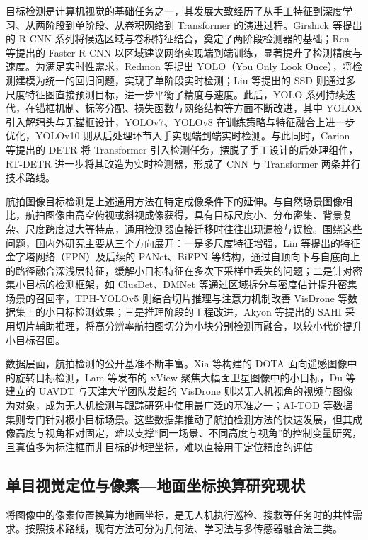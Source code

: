 目标检测是计算机视觉的基础任务之一，其发展大致经历了从手工特征到深度学习、从两阶段到单阶段、从卷积网络到 Transformer 的演进过程。Girshick 等提出的 R-CNN 系列将候选区域与卷积特征结合，奠定了两阶段检测器的基础；Ren 等提出的 Faster R-CNN 以区域建议网络实现端到端训练，显著提升了检测精度与速度。为满足实时性需求，Redmon 等提出 YOLO（You Only Look Once），将检测建模为统一的回归问题，实现了单阶段实时检测；Liu 等提出的 SSD 则通过多尺度特征图直接预测目标，进一步平衡了精度与速度。此后，YOLO 系列持续迭代，在锚框机制、标签分配、损失函数与网络结构等方面不断改进，其中 YOLOX 引入解耦头与无锚框设计，YOLOv7、YOLOv8 在训练策略与特征融合上进一步优化，YOLOv10 则从后处理环节入手实现端到端实时检测。与此同时，Carion 等提出的 DETR 将 Transformer 引入检测任务，摆脱了手工设计的后处理组件，RT-DETR 进一步将其改造为实时检测器，形成了 CNN 与 Transformer 两条并行技术路线。

航拍图像目标检测是上述通用方法在特定成像条件下的延伸。与自然场景图像相比，航拍图像由高空俯视或斜视成像获得，具有目标尺度小、分布密集、背景复杂、尺度跨度过大等特点，通用检测器直接迁移时往往出现漏检与误检。围绕这些问题，国内外研究主要从三个方向展开：一是多尺度特征增强，Lin 等提出的特征金字塔网络（FPN）及后续的 PANet、BiFPN 等结构，通过自顶向下与自底向上的路径融合深浅层特征，缓解小目标特征在多次下采样中丢失的问题；二是针对密集小目标的检测框架，如 ClusDet、DMNet 等通过区域拆分与密度估计提升密集场景的召回率，TPH-YOLOv5 则结合切片推理与注意力机制改善 VisDrone 等数据集上的小目标检测效果；三是推理阶段的工程改进，Akyon 等提出的 SAHI 采用切片辅助推理，将高分辨率航拍图切分为小块分别检测再融合，以较小代价提升小目标召回。

数据层面，航拍检测的公开基准不断丰富。Xia 等构建的 DOTA 面向遥感图像中的旋转目标检测，Lam 等发布的 xView 聚焦大幅面卫星图像中的小目标，Du 等建立的 UAVDT 与天津大学团队发起的 VisDrone 则以无人机视角的视频与图像为对象，成为无人机检测与跟踪研究中使用最广泛的基准之一；AI-TOD 等数据集则专门针对极小目标场景。这些数据集推动了航拍检测方法的快速发展，但其成像高度与视角相对固定，难以支撑“同一场景、不同高度与视角”的控制变量研究，且真值多为标注框而非目标的地理坐标，难以直接用于定位精度的评估

\subsection{单目视觉定位与像素—地面坐标换算研究现状}

将图像中的像素位置换算为地面坐标，是无人机执行巡检、搜救等任务时的共性需求。按照技术路线，现有方法可分为几何法、学习法与多传感器融合法三类。

